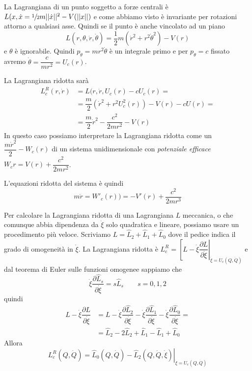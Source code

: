\documentclass[11pt,a4paper,twoside]{book}
\newenvironment{esempio}[1][Esempio]{ 
  \begin{center}\begin{tcolorbox}[
  title={#1:\\},
  width=0.9\linewidth,
  flush right,
  enhanced jigsaw, 
  colback=white, 
  frame hidden, 
  sharpish corners, arc=3mm,
  borderline west = {1pt}{0pt}{gray},
  borderline south = {1pt}{0pt}{gray},
  coltitle=black, 
  fonttitle=\small\bfseries, 
  attach title to upper, 
  breakable,
  top=2.5pt, bottom=0.3pt]\small
  }{
 \normalsize \end{tcolorbox}\end{center}
}
\theoremstyle{esss}
\theoremstyle{dotless}
\numberwithin{equation}{section} %
\begin{document}
\begin{esempio}[Punto vincolato ad un piano e soggetto a forze centrali]
La Lagrangiana di un punto soggetto a forze centrali è $L(x,\dot{x}=\sfrac{1}{2}m||\dot{x}||^2-V(||x||)$ e come abbiamo visto è invariante per rotazioni attorno a qualsiasi asse. Quindi se il punto è anche vincolato ad un piano
\[
L(r,\theta,\dot{r},\dot{\theta})=\dfrac{1}{2}m(\dot{r}^2+r^2\dot{\theta}^2)-V(r)
\]
e $\theta$ è ignorabile. Quindi $p_\theta=mr^2\dot{\theta}$ è un integrale primo e per $p_\theta=c$ fissato avremo $\dot{\theta}=\dfrac{c}{mr^2}=U_c(r)$.

La Lagrangiana ridotta sarà
\begin{align*}
L_c^R(r,\dot{r})&=L(r,\dot{r},U_c(r)-cU_c(r)=\\
&= \dfrac{m}{2}(\dot{r}^2+r^2U_c^2(r))-V(r)-cU(r)=\\
&=\dfrac{m}{2}\dot{r}^2 -\dfrac{c^2}{2mr^2}-V(r)
\end{align*}
In questo caso possiamo interpretare la Lagrangiana ridotta come un $\dfrac{m\dot{r}^2}{2}-W_c(r)$ di un sistema unidimensionale con \textit{potenziale efficace} $W_c{r}=V(r)+\dfrac{c^2}{2mr^2}$.

L'equazioni ridotta del sistema è quindi
\[
m\ddot{r}=W'_c(r))=-V'(r)+\dfrac{c^2}{2mr^3}
\]
\end{esempio}

Per calcolare la Lagrangiana ridotta di una Lagrangiana $L$ meccanica, o che comunque abbia dipendenza da $\dot{\xi}$ solo quadratica e lineare, possiamo usare un procedimento più veloce.
Scriviamo $L=\hat{L}_2+\hat{L}_1+\hat{L}_0$ dove il pedice indica il grado di omogeneità in $\dot{\xi}$.
La Lagrangiana ridotta è $L_c^R=\left[ L-\dot{\xi}\dfrac{\partial L}{\partial \dot{\xi}}\right|_{\dot{\xi}=U_c(Q,\dot{Q})}$ e dal teorema di Euler sulle funzioni omogenee sappiamo che
\[
\dot{\xi}\dfrac{\partial \hat{L}_s}{\partial\dot{\xi}}=s\hat{L}_s \qquad s=0,1,2
\]
quindi \begin{align*}
L-\dot{\xi}\dfrac{\partial L}{\partial \dot{\xi}}&=L-\dot{\xi}\dfrac{\partial \hat{L}_2}{\partial\dot{\xi}}-\dot{\xi}\dfrac{\partial \hat{L}_1}{\partial\dot{\xi}}-\dot{\xi}\dfrac{\partial \hat{L}_0}{\partial\dot{\xi}}=\\
&=\hat{L}_2-2\hat{L}_2+\hat{L}_1-\hat{L}_1+\hat{L}_0
\end{align*}
Allora
\begin{equation}
L_c^R(Q,\dot{Q})=\hat{L}_0(Q,\dot{Q})-\left.\hat{L}_2(Q,\dot{Q},\dot{\xi})\right|_{\dot{\xi}=U_c(Q,\dot{Q})}
\end{equation}
\end{document}
